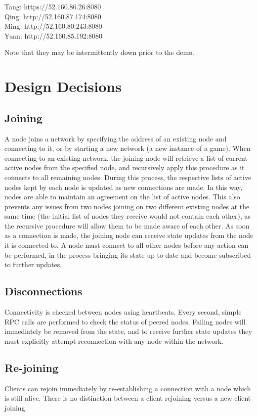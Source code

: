 \documentclass[twocolumn]{article}
\begin{document}
\begin{flushleft}
Tang: https://52.160.86.26:8080\\
Qing: http://52.160.87.174:8080\\
Ming: http://52.160.80.243:8080\\
Yuan: http://52.160.85.192:8080\\
\end{flushleft}
Note that they may be intermittently down prior to the demo.

\section{Design Decisions}
\subsection{Joining}
A node joins a network by specifying the address of an existing node and connecting to it, or by starting a new network (a new instance of a game). When connecting to an existing network, the joining node will retrieve a list of current active nodes from the specified node, and recursively apply this procedure as it connects to all remaining nodes. During this process, the respective lists of active nodes kept by each node is updated as new connections are made. In this way, nodes are able to maintain an agreement on the list of active nodes. This also prevents any issues from two nodes joining on two different existing nodes at the same time (the initial list of nodes they receive would not contain each other), as the recursive procedure will allow them to be made aware of each other. As soon as a connection is made, the joining node can receive state updates from the node it is connected to. A node must connect to all other nodes before any action can be performed, in the process bringing its state up-to-date and become subscribed to further updates.

\subsection{Disconnections}
Connectivity is checked between nodes using heartbeats. Every second, simple RPC calls are performed to check the status of peered nodes. Failing nodes will immediately be removed from the state, and to receive further state updates they must explicitly attempt reconnection with any node within the network.

\subsection{Re-joining}
Clients can rejoin immediately by re-establishing a connection with a node which is still alive. There is no distinction between a client rejoining versus a new client joining
\end{document}
